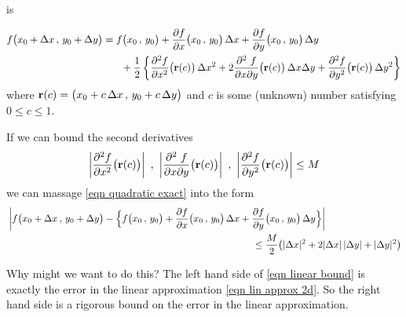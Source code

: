 is
\begin{impeqn}\label{eqn quadratic exact} 
\begin{align*}
f\big(x_0 + \De x\,,\,y_0+\De y\big)
&= f\big(x_0\,,\,y_0\big) 
       + \pdiff{f}{x}\big(x_0\,,\,y_0\big)\,\De x
       + \pdiff{f}{y}\big(x_0\,,\,y_0\big)\,\De y \\
&\hskip0.25in +\frac{1}{2}\left\{
        \frac{\partial^2 f}{\partial x^2}\big(\vr(c)\big)\,\De x^2
       +2\frac{\partial^2\ f}{\partial x\partial y}
                                     \big(\vr(c)\big) \,\De x\De y 
       + \frac{\partial^2 f}{\partial y^2}\big(\vr(c)\big)\,\De y^2
\right\}
\end{align*}
where $\mathbf{r}(c) = \big(x_0+c\,\Delta x\,,\,y_0+c\,\Delta y\big)$ and $c$
is some (unknown) number satisfying $0\le c\le 1$.
\end{impeqn}

\begin{impeqn}\label{eqn linear bound}
If we can bound the second derivatives
\begin{equation*}
\left|\frac{\partial^2 f}{\partial x^2}\big(\vr(c)\big)\right|\ ,\ 
\left|\frac{\partial^2\ f}{\partial x\partial y}
                                     \big(\vr(c)\big)\right|\ ,\ 
\left|\frac{\partial^2 f}{\partial y^2}\big(\vr(c)\big)\right|\le M
\end{equation*}
we can massage \eqref{eqn quadratic exact} into the form
\begin{align*}
&\left|f\big(x_0 + \De x\,,\,y_0+\De y\big)
-\Big\{f\big(x_0\,,\,y_0\big) 
       + \pdiff{f}{x}\big(x_0\,,\,y_0\big)\,\De x
       + \pdiff{f}{y}\big(x_0\,,\,y_0\big)\,\De y\Big\}\right| \\
&\hskip 3.5in
      \le \frac{M}{2}\big(|\De x|^2 +2|\De x|\,|\De y| +|\De y|^2\big)
\end{align*}
\end{impeqn}\noindent
Why might we want to do this? The left hand side of \eqref{eqn linear bound}
is exactly the error in the linear approximation \eqref{eqn lin approx 2d}.
So the right hand side is a rigorous bound on the error in the linear
approximation.

